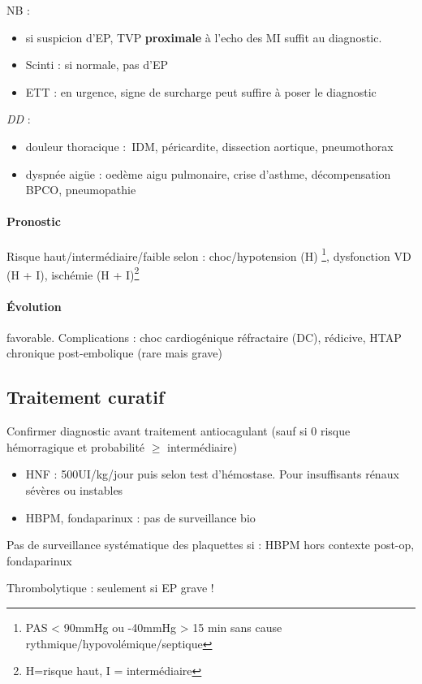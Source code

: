 \documentclass{article}
\begin{document}
NB : 
\begin{itemize}
  \item si suspicion d'EP, TVP \textbf{proximale} à l'echo des MI suffit au
diagnostic.
  \item Scinti : si normale, pas d'EP
  \item ETT : en urgence, signe de surcharge peut suffire à poser le diagnostic
\end{itemize}

\textit{DD} :
\begin{itemize}
  \item douleur thoracique : IDM, péricardite, dissection aortique,
    pneumothorax
  \item dyspnée aigüe : oedème aigu pulmonaire, crise d'asthme, décompensation
    BPCO, pneumopathie
\end{itemize}

\paragraph{Pronostic}
Risque haut/intermédiaire/faible selon : choc/hypotension (H) \footnote{PAS < 90mmHg
ou -40mmHg > 15 min sans cause rythmique/hypovolémique/septique}, dysfonction
VD (H + I), ischémie (H + I)\footnote{H=risque haut, I = intermédiaire}

\paragraph{Évolution} favorable. Complications : choc cardiogénique réfractaire
(DC), rédicive, HTAP chronique post-embolique (rare mais grave)

\subsection{Traitement curatif}
Confirmer diagnostic avant traitement antiocagulant (sauf si 0 risque
hémorragique et probabilité $\ge$ intermédiaire)

\begin{itemize}
  \item HNF : 500UI/kg/jour puis selon test d'hémostase. Pour insuffisants
    rénaux sévères ou instables
  \item HBPM, fondaparinux : pas de surveillance bio
\end{itemize}
Pas de surveillance systématique des plaquettes si : HBPM hors contexte post-op,
fondaparinux 

Thrombolytique : seulement si EP grave !
\end{document}

